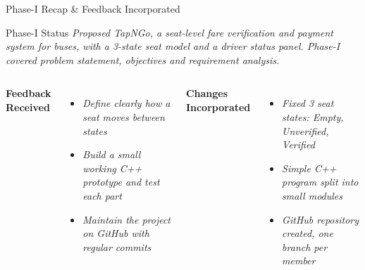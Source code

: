 \documentclass[aspectratio=169,11pt]{beamer}
\newcommand{\smallnote}[1]{%
\vspace{0.08cm}
{\scriptsize\color{GEUGrey}#1}
}
\newcommand{\placeholder}[1]{%
\textit{\color{GEUGrey}#1}
}
\begin{document}
\begin{frame}{Phase-I Recap \& Feedback Incorporated}

\vspace{-5mm}

\begin{block}{Phase-I Status}
\placeholder{
Proposed TapNGo, a seat-level fare verification and payment system for buses, with a 3-state seat model and a driver status panel. Phase-I covered problem statement, objectives and requirement analysis.
}
\end{block}

\vspace{2mm}

\begin{columns}[T,totalwidth=\textwidth]


\textbf{\color{GEUBlue}Feedback Received}

\begin{itemize}\itemsep2pt
\item \placeholder{Define clearly how a seat moves between states}
\item \placeholder{Build a small working C++ prototype and test each part}
\item \placeholder{Maintain the project on GitHub with regular commits}
\end{itemize}


\textbf{\color{GEUBlue}Changes Incorporated}

\begin{itemize}\itemsep2pt
\item \placeholder{Fixed 3 seat states: Empty, Unverified, Verified}
\item \placeholder{Simple C++ program split into small modules}
\item \placeholder{GitHub repository created, one branch per member}
\end{itemize}

\end{columns}

\vfill


\end{frame}
\end{document}
